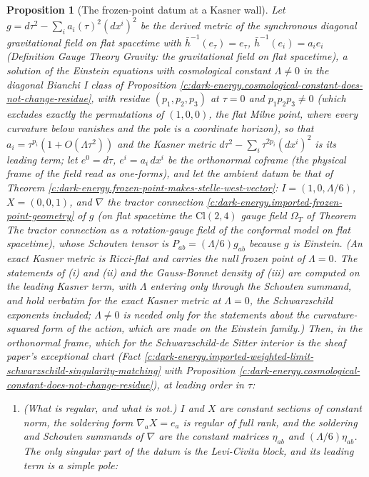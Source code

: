 \documentclass[11pt]{article}
\newtheorem{proposition}[theorem]{Proposition}
\theoremstyle{definition}
\theoremstyle{plain}
\newcommand{\changedmark}[2]{\marginpar{\raggedright\scriptsize\color{#1}#2}}
\providecommand{\Cl}{}\renewcommand{\Cl}{\mathrm{Cl}}
\providecommand{\hb}{}\renewcommand{\hb}{\bar{h}}
\begin{document}
\begin{proposition}[The frozen-point datum at a Kasner wall]\label{c:dark-energy.frozen-point-datum-kasner-wall}
\changedmark{BurntOrange}{changed since the deposit}
Let $g = d\tau^2 - \sum_i a_i(\tau)^2(dx^i)^2$ be the derived metric of the synchronous diagonal gravitational field on flat spacetime with $\hb^{-1}(e_\tau) = e_\tau$, $\hb^{-1}(e_i) = a_i e_i$ (Definition \emph{Gauge Theory Gravity: the gravitational field on flat spacetime}), a solution of the Einstein equations with cosmological constant $\Lambda \neq 0$ in the diagonal Bianchi I class of Proposition \ref{c:dark-energy.cosmological-constant-does-not-change-residue}, with residue $(p_1,p_2,p_3)$ at $\tau = 0$ and $p_1p_2p_3 \neq 0$ (which excludes exactly the permutations of $(1,0,0)$, the flat Milne point, where every curvature below vanishes and the pole is a coordinate horizon), so that $a_i = \tau^{p_i}(1 + O(\Lambda\tau^2))$ and the Kasner metric $d\tau^2 - \sum_i\tau^{2p_i}(dx^i)^2$ is its leading term; let $e^0 = d\tau$, $e^i = a_i\,dx^i$ be the orthonormal coframe (the physical frame of the field read as one-forms), and let the ambient datum be that of Theorem \ref{c:dark-energy.frozen-point-makes-stelle-west-vector}: $I = (1, 0, \Lambda/6)$, $X = (0,0,1)$, and $\nabla$ the tractor connection \ref{c:dark-energy.imported-frozen-point-geometry} of $g$ (on flat spacetime the $\Cl(2,4)$ gauge field $\Omega_{T}$ of Theorem \emph{The tractor connection as a rotation-gauge field of the conformal model on flat spacetime}), whose Schouten tensor is $P_{ab} = (\Lambda/6)g_{ab}$ because $g$ is Einstein. (An exact Kasner metric is Ricci-flat and carries the null frozen point of $\Lambda = 0$. The statements of (i) and (ii) and the Gauss-Bonnet density of (iii) are computed on the leading Kasner term, with $\Lambda$ entering only through the Schouten summand, and hold verbatim for the exact Kasner metric at $\Lambda = 0$, the Schwarzschild exponents included; $\Lambda \neq 0$ is needed only for the statements about the curvature-squared form of the action, which are made on the Einstein family.) Then, in the orthonormal frame, which for the Schwarzschild-de Sitter interior is the sheaf paper's exceptional chart (Fact \ref{c:dark-energy.imported-weighted-limit-schwarzschild-singularity-matching} with Proposition \ref{c:dark-energy.cosmological-constant-does-not-change-residue}), at leading order in $\tau$:
\begin{enumerate}
\item[(i)] \emph{(What is regular, and what is not.)} $I$ and $X$ are constant sections of constant norm, the soldering form $\nabla_a X = e_a$ is regular of full rank, and the soldering and Schouten summands of $\nabla$ are the constant matrices $\eta_{ab}$ and $(\Lambda/6)\eta_{ab}$. The only singular part of the datum is the Levi-Civita block, and its leading term is a simple pole:

\end{enumerate}
\end{proposition}
\end{document}
